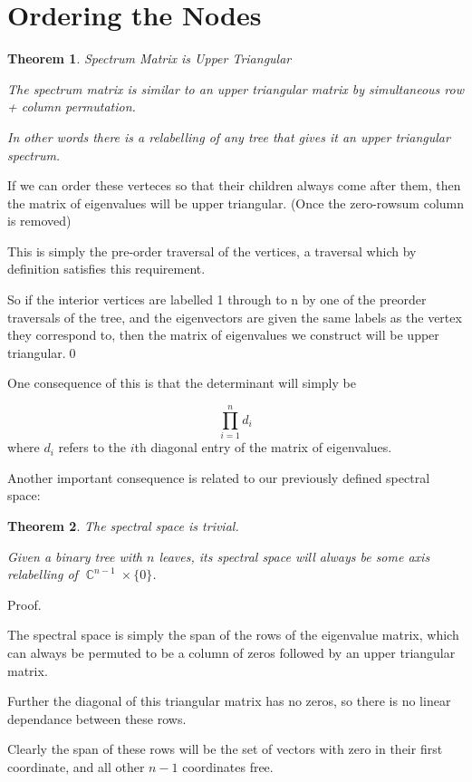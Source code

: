 \documentclass[10pt,a4paper]{report}
\DeclareMathOperator{\C}{\mathds{C}}
\newtheorem{theorem}{Theorem}
\begin{document}
\section{Ordering the Nodes}

\begin{theorem} Spectrum Matrix is Upper Triangular

	The spectrum matrix is similar to an upper triangular matrix by simultaneous row + column permutation.

	In other words there is a relabelling of any tree that gives it an upper triangular spectrum.
\end{theorem}

If we can order these verteces so that their children always come after them, then
the matrix of eigenvalues will be upper triangular. (Once the zero-rowsum
column is removed)

This is simply the pre-order traversal of the vertices, a traversal which by
definition satisfies this requirement.

So if the interior vertices are labelled 1 through to n by one of the preorder
traversals of the tree, and the eigenvectors are given the same labels as the
vertex they correspond to, then the matrix of eigenvalues we construct will
be upper triangular.\qed

One consequence of this is that the determinant will simply be

\[\prod_{i=1}^n d_i\]
where $d_i$ refers to the $i$th diagonal entry of the matrix of eigenvalues.

Another important consequence is related to our previously defined spectral
space:

\begin{theorem} The spectral space is trivial.

	Given a binary tree with $n$ leaves, its spectral space will always be some
	axis relabelling of $\C^{n-1} \times \{0\}$.
\end{theorem}

Proof.

The spectral space is simply the span of the rows of the eigenvalue matrix,
which can always be permuted to be a column of zeros followed by an upper
triangular matrix.

Further the diagonal of this triangular matrix has no zeros, so there is no
linear dependance between these rows.

Clearly the span of these rows will be the set of vectors with zero in their
first coordinate, and all other $n-1$ coordinates free.
\end{document}

